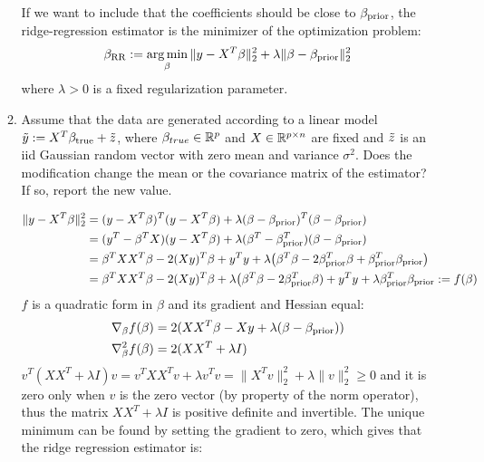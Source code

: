 \documentclass[12pt,twoside]{article}
\begin{document}
\begin{enumerate}
\begin{enumerate}
  \medskip
   If we want to include that the coefficients should be close to $\beta_{\operatorname{prior}}$, the ridge-regression estimator is the minimizer of the optimization problem:
   $$\beta_{\operatorname{RR}} := \operatorname*{arg\,min}_\beta \| y - X^T \beta \|_2^2 + \lambda \| \beta - \beta_{\operatorname{prior}} \|_2^2$$
   where $\lambda > 0$ is a fixed regularization parameter.
   
   \item Assume that the data are generated according to a linear model $\tilde{ y }:= X^T \beta_{\operatorname{true}} + \tilde{ z }$, where $\beta_{true}\in \mathbb{R}^{p}$ and $X  \in \mathbb{R}^{p \times n}$ are fixed and $\tilde{ z }$ is an iid Gaussian random vector with zero mean and variance $\sigma^2$. Does the modification change the mean or the covariance matrix of the estimator? If so, report the new value.\\
   
\medskip
 
 \begin{align*}
 	\| y - X^T \beta \|_2^2		&=	(y - X^T \beta)^T (y - X^T \beta) + \lambda (\beta - \beta_{\operatorname{prior}})^T (\beta - \beta_{\operatorname{prior}}) \\
							&=	(y^T - \beta^T X)  (y - X^T \beta) + \lambda (\beta^T - \beta_{\operatorname{prior}}^T) (\beta - \beta_{\operatorname{prior}}) \\
							&=	\beta^T X X^T \beta -2 (X y)^T \beta + y^T y + \lambda \big( \beta^T \beta -2  \beta_{\operatorname{prior}}^T \beta +  \beta_{\operatorname{prior}}^T \beta_{\operatorname{prior}} \big) \\
							&=	\beta^T X X^T \beta -2 (X y)^T \beta + \lambda \big( \beta^T \beta -2  \beta_{\operatorname{prior}}^T \beta) +  y^T y +  \lambda  \beta_{\operatorname{prior}}^T \beta_{\operatorname{prior}} := f(\beta)
 \end{align*}    
 $f$ is a quadratic form in $\beta$ and its gradient and Hessian equal:
 \begin{align*}
 	\nabla_{\beta} f(\beta)		&=	2 (X X^T \beta - X y +  \lambda (\beta - \beta_{\operatorname{prior}}))  \\
	\nabla_{\beta}^2 f(\beta)		&=	2 (X X^T  +  \lambda I) 
 \end{align*}    
  $v^T (X X^T  +  \lambda I) v  = v^T X X^T v + \lambda v^T v = \|X^T v \|_2^2 + \lambda \| v \|_2^2 \ge 0$ and it is zero only when $v$ is the zero vector (by property of the norm operator), thus the matrix $X X^T  +  \lambda I$ is positive definite
  and invertible. The unique minimum can be found by setting the gradient to zero, which gives that the ridge regression estimator is:
  

\end{enumerate}
\end{enumerate}
\end{document}
